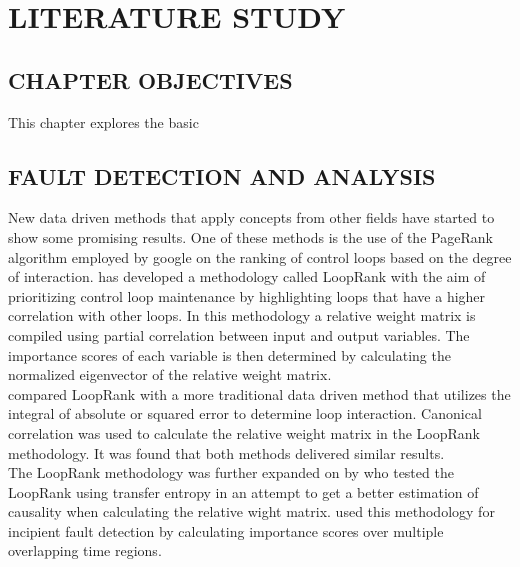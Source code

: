 
\chapter{LITERATURE STUDY}

\section{CHAPTER OBJECTIVES}

This chapter explores the basic 

\section{FAULT DETECTION AND ANALYSIS}

New data driven methods that apply concepts from other fields have started to show some promising results. One of these methods is the use of the PageRank algorithm \cite{bryan200625} employed by google on the ranking of control loops based on the degree of interaction.\cite{farenzena2009looprank} has developed a methodology called LoopRank with the aim of prioritizing control loop maintenance by highlighting loops that have a higher correlation with other loops. In this methodology a relative weight matrix is compiled using partial correlation between input and output variables. The importance scores of each variable is then determined by calculating the normalized eigenvector of the relative weight matrix.\\ 

\cite{rahman2010new} compared LoopRank with a more traditional data driven method that utilizes the integral of absolute or squared error to determine loop interaction. Canonical correlation was used to calculate the relative weight matrix in the LoopRank methodology.
It was found that both methods delivered similar results.\\ 

The LoopRank methodology was further expanded on by \cite{streicher2014eigenvector} who tested the LoopRank using transfer entropy in an attempt to get a better estimation of causality when calculating the relative wight matrix. \cite{streicher2019plant} used this methodology for incipient fault detection by calculating importance scores over multiple overlapping time regions. \\ 

